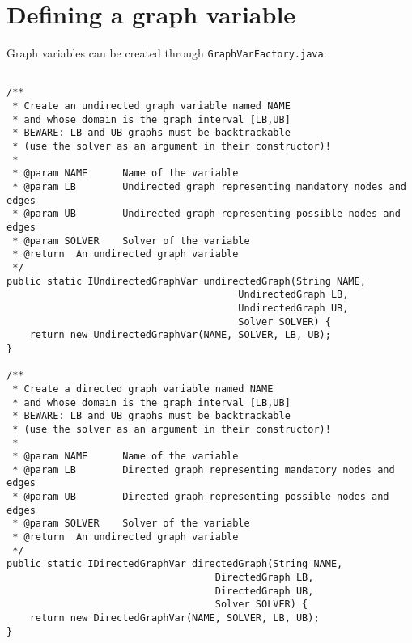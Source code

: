 \documentclass{article}
\begin{document}
\newpage{}
\section{Defining a graph variable}

Graph variables can be created through \texttt{GraphVarFactory.java}:

\lstset{language=Java} 

 
\begin{lstlisting}

/**
 * Create an undirected graph variable named NAME
 * and whose domain is the graph interval [LB,UB]
 * BEWARE: LB and UB graphs must be backtrackable 
 * (use the solver as an argument in their constructor)!
 *
 * @param NAME		Name of the variable
 * @param LB		Undirected graph representing mandatory nodes and edges
 * @param UB		Undirected graph representing possible nodes and edges
 * @param SOLVER	Solver of the variable
 * @return	An undirected graph variable
 */
public static IUndirectedGraphVar undirectedGraph(String NAME, 
										UndirectedGraph LB, 
										UndirectedGraph UB, 
										Solver SOLVER) {
	return new UndirectedGraphVar(NAME, SOLVER, LB, UB);
}

/**
 * Create a directed graph variable named NAME
 * and whose domain is the graph interval [LB,UB]
 * BEWARE: LB and UB graphs must be backtrackable 
 * (use the solver as an argument in their constructor)!
 *
 * @param NAME		Name of the variable
 * @param LB		Directed graph representing mandatory nodes and edges
 * @param UB		Directed graph representing possible nodes and edges
 * @param SOLVER	Solver of the variable
 * @return	An undirected graph variable
 */
public static IDirectedGraphVar directedGraph(String NAME, 
									DirectedGraph LB, 
									DirectedGraph UB, 
									Solver SOLVER) {
	return new DirectedGraphVar(NAME, SOLVER, LB, UB);
}
\end{lstlisting}
\end{document}
